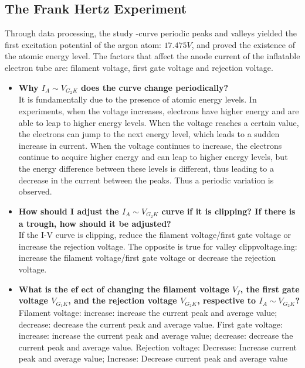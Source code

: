 \documentclass[UTF8]{article}
\begin{document}
\subsection{The Frank Hertz Experiment}
Through data processing, the study -curve periodic peaks and valleys yielded the first excitation potential of the argon atom: $17.475V$, and proved the existence of the atomic energy level. The factors that affect the anode current of the inflatable electron tube are: filament voltage, first gate voltage and rejection voltage.
\begin{itemize}
\item \textbf{Why $I_A \sim V_{G_2K}$ does the curve change periodically?}\\
It is fundamentally due to the presence of atomic energy levels. In experiments, when the voltage increases, electrons have higher energy and are able to leap to higher energy levels. When the voltage reaches a certain value, the electrons can jump to the next energy level, which leads to a sudden increase in current. When the voltage continues to increase, the electrons continue to acquire higher energy and can leap to higher energy levels, but the energy difference between these levels is different, thus leading to a decrease in the current between the peaks. Thus a periodic variation is observed.
\item \textbf{How should I adjust the $I_A \sim V_{G_2K}$ curve if it is clipping? If there is a trough, how should it be adjusted?}\\
If the I-V curve is clipping, reduce the filament voltage/first gate voltage or increase the rejection voltage. The opposite is true for valley clippvoltage.ing: increase the filament voltage/first gate voltage or decrease the rejection voltage.
\item \textbf{What is the ef ect of changing the filament voltage $V_f$, the first gate voltage $V_{G_1K}$, and the
rejection voltage $V_{G_2K}$, respective to $I_A \sim V_{G_2K}$?}\\
Filament voltage: increase: increase the current peak and average value; decrease: decrease the current peak and average value. First gate voltage: increase: increase the current peak and average value; decrease: decrease the current peak and average value. Rejection voltage: Decrease: Increase current peak and average value; Increase: Decrease current peak and average value
\end{itemize} 
\end{document}
